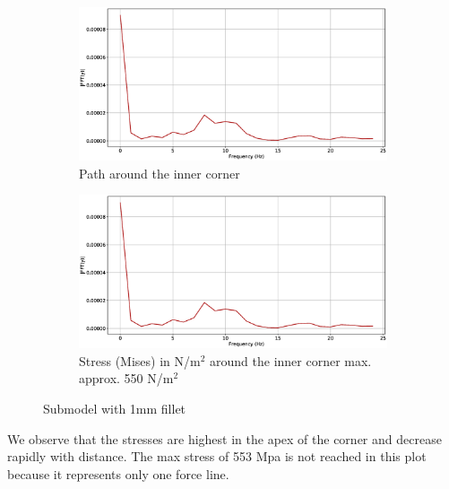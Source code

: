 \documentclass[12pt]{article}
\begin{document}
\begin{figure}[!htb]
  \centering
  \begin{subfigure}{.5\textwidth}
    \centering
    \includegraphics[width=0.95\linewidth]{pics/vib_fourier}
    \caption{Path around the inner corner}
  \end{subfigure}%
  \begin{subfigure}{.5\textwidth}
    \centering
    \includegraphics[width=0.95\linewidth]{pics/vib_fourier}
    \caption{Stress (Mises) in N/m$^{2}$ around the inner corner max. approx. 550 N/m$^{2}$}
   \end{subfigure}
  \caption{Submodel with 1mm fillet}
\end{figure}

We observe that the stresses are highest in the apex of the corner and decrease rapidly with 
distance. The max stress of 553 Mpa is not reached in this plot because it represents only one force line.
\end{document}
